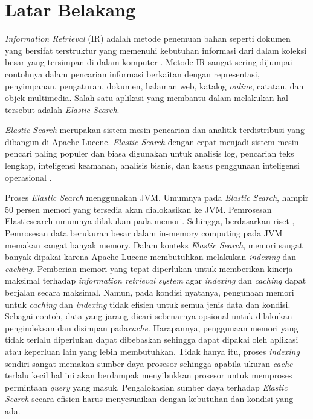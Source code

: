 \section{Latar Belakang}

\textit{Information Retrieval} (IR) adalah metode penemuan bahan seperti dokumen yang bersifat terstruktur yang memenuhi kebutuhan informasi dari dalam koleksi besar yang tersimpan di dalam komputer \parencite{inforetrieval}. Metode IR sangat sering dijumpai contohnya dalam pencarian informasi berkaitan dengan representasi, penyimpanan, pengaturan, dokumen, halaman web, katalog \textit{online}, catatan, dan objek multimedia. Salah satu aplikasi yang membantu dalam melakukan hal tersebut adalah \textit{Elastic Search}.

\textit{Elastic Search} merupakan sistem mesin pencarian dan analitik terdistribusi yang dibangun di Apache Lucene. \textit{Elastic Search} dengan cepat menjadi sistem mesin pencari paling populer dan biasa digunakan untuk analisis log, pencarian teks lengkap, inteligensi keamanan, analisis bisnis, dan kasus penggunaan inteligensi operasional \parencite{elasticsearch}.

Proses \textit{Elastic Search} menggunakan JVM. Umumnya pada \textit{Elastic Search}, hampir 50 persen memori yang tersedia akan dialokasikan ke JVM. Pemrosesan Elasticsearch umumnya dilakukan pada memori. Sehingga, berdasarkan riset \parencite{jvm}, Pemrosesan data berukuran besar dalam in-memory computing pada JVM memakan sangat banyak memory. Dalam konteks \textit{Elastic Search}, memori sangat banyak dipakai karena Apache Lucene membutuhkan melakukan \textit{indexing} dan \textit{caching}. Pemberian memori yang tepat diperlukan untuk memberikan kinerja maksimal terhadap \textit{information retrieval system} agar \textit{indexing} dan \textit{caching} dapat berjalan secara maksimal. Namun, pada kondisi nyatanya, pengunaan memori untuk \textit{caching} dan \textit{indexing} tidak efisien untuk semua jenis data dan kondisi. Sebagai contoh, data yang jarang dicari sebenarnya opsional untuk dilakukan pengindeksan dan disimpan pada\textit{cache}. Harapannya, penggunaan memori yang tidak terlalu diperlukan dapat dibebaskan sehingga dapat dipakai oleh aplikasi atau keperluan lain yang lebih membutuhkan. Tidak hanya itu, proses \textit{indexing} sendiri sangat memakan sumber daya prosesor sehingga apabila ukuran \textit{cache} terlalu kecil hal ini akan berdampak menyibukkan prosesor untuk memproses permintaan \textit{query} yang masuk. Pengalokasian sumber daya terhadap \textit{Elastic Search} secara efisien harus menyesuaikan dengan kebutuhan dan kondisi yang ada.

